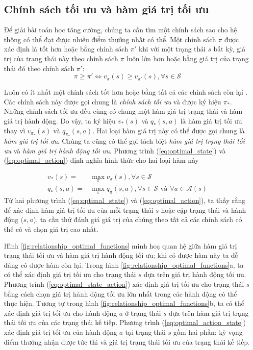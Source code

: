 \subsection{Chính sách tối ưu và hàm giá trị tối ưu}
Để giải bài toán học tăng cường, chúng ta cần tìm một chính sách sao cho hệ thống có thể đạt được nhiều điểm thưởng nhất có thể. 
Một chính sách $\pi$ được xác định là tốt hơn hoặc bằng chính sách $\pi'$ khi với một trạng thái $s$ bất kỳ, giá trị của trạng thái này theo chính sách $\pi$ luôn lớn hơn hoặc bằng giá trị của trạng thái đó theo chính sách $\pi'$:
\begin{equation}
\pi \geq \pi' \Longleftrightarrow v_{\pi}(s) \geq v_{\pi'}(s), \forall s \in \mathcal{S}
\end{equation}

Luôn có ít nhất một chính sách tốt hơn hoặc bằng tất cả các chính sách còn lại \cite{sutton1998introduction}. 
Các chính sách này được gọi chung là \textit{chính sách tối ưu} và được ký hiệu $\pi_{*}$. 
Những chính sách tối ưu đều cùng có chung một hàm giá trị trạng thái và hàm giá trị hành động.
Do vậy, ta ký hiệu $v_{*}(s)$ và $q_{*}(s,a)$ là hàm giá trị tối ưu thay vì $v_{\pi_{*}}(s)$ và $q_{\pi_{*}}(s, a)$.
Hai loại hàm giá trị này có thể được gọi chung là \textit{hàm giá trị tối ưu}. 
Chúng ta cũng có thể gọi tách biệt \textit{hàm giá trị trạng thái tối ưu} và \textit{hàm giá trị hành động tối ưu}. 
Phương trình (\ref{eq:optimal_state}) và (\ref{eq:optimal_action}) định nghĩa hình thức cho hai loại hàm này

\begin{align}
v_{*}(s) = {} & \max_{\pi}v_{\pi}(s), \forall s \in \mathcal{S} \label{eq:optimal_state} \\
q_{*}(s,a) = {} & \max_{\pi}q_{\pi}(s,a), \forall s \in \mathcal{S} \text{ và } \forall a \in \mathcal{A}(s) \label{eq:optimal_action}
\end{align}
Từ hai phương trình (\ref{eq:optimal_state}) và (\ref{eq:optimal_action}), ta thấy rằng để xác định hàm giá trị tối ưu của mỗi trạng thái $s$ hoặc cặp trạng thái và hành động ($s,a$), ta cần thử đánh giá giá trị của chúng theo tất cả các chính sách có thể có và chọn giá trị cao nhất.

Hình \ref{fig:relationship_optimal_functions} minh hoạ quan hệ giữa hàm giá trị trạng thái tối ưu và hàm giá trị hành động tối ưu; khi có được hàm này ta dễ dàng có được hàm còn lại. 
Trong hình \ref{fig:relationship_optimal_functions}a, ta có thể xác định giá trị tối ưu cho trạng thái $s$ dựa trên giá trị hành động tối ưu. 
Phương trình (\ref{eq:optimal_state_action}) xác định giá trị tối ưu cho trạng thái $s$ bằng cách chọn giá trị hành động tối ưu lớn nhất trong các hành động có thể thực hiện. 
Tương tự trong hình \ref{fig:relationship_optimal_functions}b, ta có thể xác định giá trị tối ưu cho hành động $a$ ở trạng thái $s$ dựa trên hàm giá trị trạng thái tối ưu của các trạng thái kế tiếp. 
Phương trình (\ref{eq:optimal_action_state}) xác định giá trị tối ưu của hành động $a$ tại trạng thái $s$ gồm hai phần: kỳ vọng điểm thưởng nhận được tức thì và giá trị trạng thái tối ưu của trạng thái kế tiếp.

